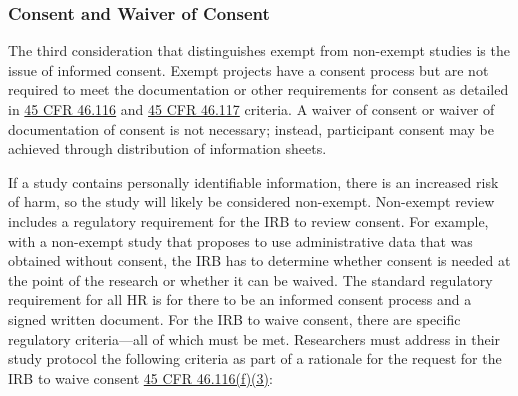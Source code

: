 \hypertarget{consent-and-waiver-of-consent}{%
\subsubsection{Consent and Waiver of Consent}\label{consent-and-waiver-of-consent}}

The third consideration that distinguishes exempt from non-exempt studies is the issue of informed consent. Exempt projects have a consent process but are not required to meet the documentation or other requirements for consent as detailed in \href{https://www.law.cornell.edu/cfr/text/45/46.116}{45 CFR 46.116} and \href{https://www.law.cornell.edu/cfr/text/45/46.117}{45 CFR 46.117} criteria. A waiver of consent or waiver of documentation of consent is not necessary; instead, participant consent may be achieved through distribution of information sheets.

If a study contains personally identifiable information, there is an increased risk of harm, so the study will likely be considered non-exempt. Non-exempt review includes a regulatory requirement for the IRB to review consent. For example, with a non-exempt study that proposes to use administrative data that was obtained without consent, the IRB has to determine whether consent is needed at the point of the research or whether it can be waived. The standard regulatory requirement for all HR is for there to be an informed consent process and a signed written document. For the IRB to waive consent, there are specific regulatory criteria---all of which must be met. Researchers must address in their study protocol the following criteria as part of a rationale for the request for the IRB to waive consent \href{https://www.law.cornell.edu/cfr/text/45/46.116}{45 CFR 46.116(f)(3)}:

